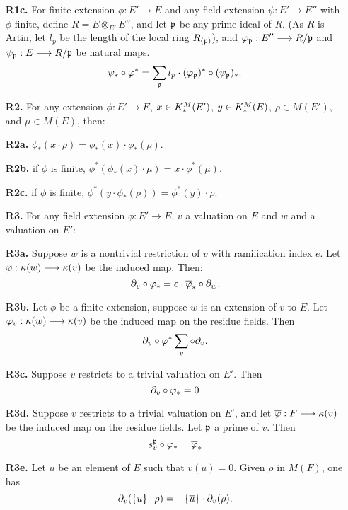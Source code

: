 \begin{defn}
\begin{enumerate}
\item[\textbf{R1c.}] For finite extension $\phi: E' \to E$ and any 
field extension $\psi: E' \to E''$ with $\phi$ finite, define $R = E 
\otimes_{E'} E''$, and let $\mathfrak{p}$ be any prime ideal of $R$. (As 
$R$ is Artin, let $l_p$ be the length of the local ring 
$R_{(\mathfrak{p})}$), and $\varphi_{\mathfrak{p}}: E'' \longrightarrow R/{\mathfrak{p}}$ 
and $\psi_{\mathfrak{p}}: E \longrightarrow R/{\mathfrak{p}}$ be natural maps.
\[
\psi_*\circ \varphi^* = \sum_{\mathfrak{p}} l_p \cdot 
(\varphi_{\mathfrak{p}})^* \circ (\psi_{\mathfrak{p}})_*.
\]

\item[\textbf{R2.}] For any extension $\phi: E' \to E$, $x \in 
K^M_*(E')$, $y \in K^M_*(E)$, $\rho \in M(E')$, and $\mu \in 
M(E)$, then:

\item[\textbf{R2a.}] $\phi_*(x \cdot \rho) = \phi_*(x) \cdot 
\phi_*(\rho)$.

\item[\textbf{R2b.}] if $\phi$ is finite, $\phi^*(\phi_*(x) \cdot 
\mu) = x \cdot \phi^*(\mu)$.

\item[\textbf{R2c.}] if $\phi$ is finite, $\phi^*(y \cdot 
\phi_*(\rho)) = \phi^*(y) \cdot \rho$.

\item[\textbf{R3.}] For any field extension $\phi: E' \to E$, $v$ 
a valuation on $E$ and $w$ and a valuation on $E'$:

\item[\textbf{R3a.}] Suppose $w$ is a nontrivial restriction of 
$v$ with ramification index $e$. Let $\overline{\varphi}: \kappa(w) \longrightarrow 
\kappa(v)$ be the induced map. Then:
\[
\partial_{v} \circ \varphi_* = e \cdot \overline{\varphi}_* \circ \partial_{w}.
\]

\item[\textbf{R3b.}] Let $\phi$ be a finite extension, suppose
$w$ is an extension of $v$ to $E$. Let $\varphi_v: \kappa(w) \longrightarrow 
\kappa(v)$ be the induced map on the residue fields. Then
\[
\partial_{v} \circ \varphi^* \sum_{v} \circ \partial_{v}.
\]

\item[\textbf{R3c.}] Suppose $v$ restricts to a trivial valuation 
on $E'$. Then
\[
\partial_{v} \circ \varphi_* = 0
\]

\item[\textbf{R3d.}] Suppose $v$ restricts to a trivial valuation 
on $E'$, and let $\overline{\varphi}: F \longrightarrow \kappa(v)$ be the induced map on 
the residue fields. Let $\mathfrak{p}$ a prime of $v$. Then
\[
s_{v}^{\mathfrak{p}} \circ \varphi_* = \overline{\varphi}_*
\]

\item[\textbf{R3e.}] Let $u$ be an element of $E$ such that 
$v(u) = 0$. Given $\rho$ in $M(F)$, one has
\[
\partial_{v}(\{u\} \cdot \rho) = -\{\overline{u}\} \cdot \partial_{v}(\rho).
\]
\end{enumerate}
\end{defn}

